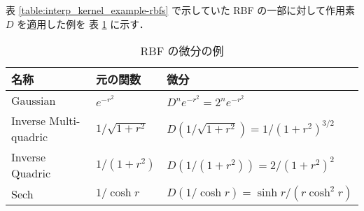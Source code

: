 表 \ref{table:interp_kernel_example-rbfs} で示していた RBF の一部に対して作用素 $D$ を適用した例を
表 \ref{table:interp_kernel_rbf-derivatives} に示す．

\begin{table}[bp]
    \caption{RBF の微分の例}
    \label{table:interp_kernel_rbf-derivatives}
    \centering
    \begin{tabular}{lll}
        名称                    & 元の関数               & 微分                                             \\
        \hline
        Gaussian              & $e^{-r^2}$         & $D^n e^{-r^2} = 2^n e^{-r^2}$                  \\
        Inverse Multi-quadric & $1/\sqrt{1 + r^2}$ & $D (1/\sqrt{1 + r^2}) = 1/(1 + r^2)^{3/2}$     \\
        Inverse Quadric       & $1 / (1 + r^2)$    & $D (1 / (1 + r^2)) = 2/(1 + r^2)^2$            \\
        Sech                  & $1 / \cosh{r}$     & $D (1 / \cosh{r}) = \sinh{r} / (r \cosh^2{r})$
    \end{tabular}
\end{table}

